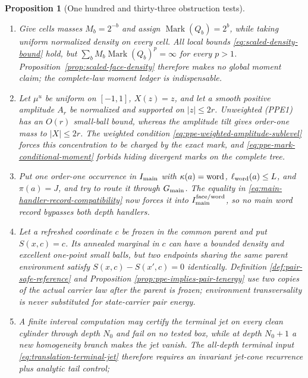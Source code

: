 \documentclass[11pt]{article}
\newtheorem{proposition}[theorem]{Proposition}
\begin{document}
\begin{proposition}[One hundred and thirty-three obstruction tests]
\begin{enumerate}[label=\textup{(T\arabic*)}]
      transform is identically one.  The typed comparison
      \eqref{eq:truncation-law-comparison} rejects this substitution of an
      unrelated truncated law.
\item Give cells masses $M_b=2^{-b}$ and assign
      $\operatorname{Mark}(Q_b)=2^b$, while taking uniform normalized density
      on every cell.  All local bounds \eqref{eq:scaled-density-bound} hold,
      but $\sum_bM_b\operatorname{Mark}(Q_b)^p=\infty$ for every $p>1$.
      Proposition~\ref{prop:scaled-face-density} therefore makes no global
      moment claim; the complete-law moment ledger is indispensable.
\item Let $\mu^u$ be uniform on $[-1,1]$, $X(z)=z$, and let a smooth positive
      amplitude $A_r$ be normalized and supported on $|z|\le2r$.  Unweighted
      \textup{(PPE1)} has an $O(r)$ small-ball bound, whereas the amplitude
      tilt gives order-one mass to $|X|\le2r$.  The weighted condition
      \eqref{eq:ppe-weighted-amplitude-sublevel} forces this concentration to
      be charged by the exact mark, and
      \eqref{eq:ppe-mark-conditional-moment} forbids hiding divergent marks
      on the complete tree.
\item Put one order-one occurrence in $I_{\rm main}$ with
      $\kappa(a)={\rm word}$, $\ell_{\rm word}(a)\le L$, and $\pi(a)=J$, and
      try to route it through $G_{\rm main}$.  The equality in
      \eqref{eq:main-handler-record-compatibility} now forces it into
      $I_{\rm main}^{\rm face/word}$, so no main word record bypasses both
      depth handlers.
\item Let a refreshed coordinate $c$ be frozen in the common parent and put
      $S(x,c)=c$.  Its annealed marginal in $c$ can have a bounded density and
      excellent one-point small balls, but two endpoints sharing the same
      parent environment satisfy $S(x,c)-S(x',c)=0$ identically.  Definition
      \ref{def:pair-safe-reference} and Proposition
      \ref{prop:ppe-implies-pair-tenergy} use two copies of the actual carrier
      law after the parent is frozen; environment transversality is never
      substituted for state-carrier pair energy.
\item A finite interval computation may certify the terminal jet on every
      clean cylinder through depth $N_0$ and fail on no tested box, while at
      depth $N_0+1$ a new homogeneity branch makes the jet vanish.  The
      all-depth terminal input \eqref{eq:translation-terminal-jet} therefore
      requires an invariant jet-cone recurrence plus analytic tail control;

\end{enumerate}
\end{proposition}
\end{document}
